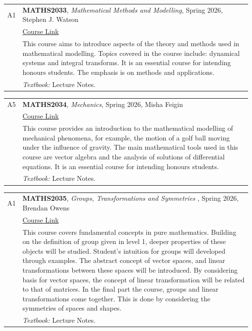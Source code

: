 \documentclass[12pt]{article}
\begin{document}
\begin{itemize}[leftmargin = *]
        \begin{tabularx}{\textwidth}{@{}lX@{}}
            A1 & \textbf{MATHS2033}, \textit{Mathematical Methods and Modelling}, Spring 2026,  Stephen J. Watson
            \\
            &
            \href{https://www.gla.ac.uk/coursecatalogue/course/?code=MATHS2033}{Course Link} \\
            &
            This course aims to introduce aspects of the theory and methods used in mathematical modelling. Topics covered in the course include: dynamical systems and integral transforms. It is an essential course for intending honours students. The emphasis is on methods and applications.       \\
            & \textit{Textbook:}  Lecture Notes.
        \end{tabularx}

        \begin{tabularx}{\textwidth}{@{}lX@{}}
            A5 & \textbf{MATHS2034}, \textit{Mechanics}, Spring 2026,   Misha Feigin
            \\
            &
            \href{https://www.gla.ac.uk/coursecatalogue/course/?code=MATHS2034}{Course Link} \\
            &
            This course provides an introduction to the mathematical modelling of mechanical phenomena, for example, the motion of a golf ball moving under the influence of gravity. The main mathematical tools used in this course are vector algebra and the analysis of solutions of differential equations. It is an essential course for intending honours students. \\
            & \textit{Textbook:}  Lecture Notes.
        \end{tabularx}

        \begin{tabularx}{\textwidth}{@{}lX@{}}
            A1 & \textbf{MATHS2035}, \textit{Groups, Transformations and Symmetries }, Spring 2026,  Brendan Owens
            \\
            &
            \href{https://www.gla.ac.uk/coursecatalogue/course/?code=MATHS2035}{Course Link} \\
            &
            This course covers fundamental concepts in pure mathematics. Building on the definition of group given in level 1, deeper properties of these objects will be studied. Student's intuition for groups will developed through examples. The abstract concept of vector spaces, and linear transformations between these spaces will be introduced. By considering basis for vector spaces, the concept of linear transformation will be related to that of matrices. In the final part the course, groups and linear transformations come together. This is done by considering the symmetries of spaces and shapes.        \\
            & \textit{Textbook:}  Lecture Notes.
        \end{tabularx}
        

\end{itemize}
\end{document}
